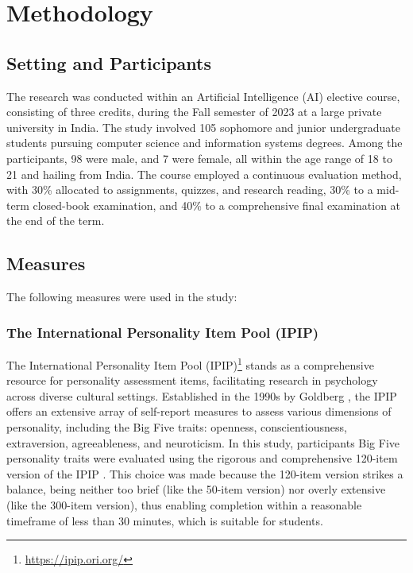\section{Methodology} \label{sec:method}

\subsection{Setting and Participants}
The research was conducted within an Artificial Intelligence (AI) elective course, consisting of three credits, during the Fall semester of 2023 at a large private university in India. The study involved 105 sophomore and junior undergraduate students pursuing computer science and information systems degrees. Among the participants, 98 were male, and 7 were female, all within the age range of 18 to 21 and hailing from India. The course employed a continuous evaluation method, with 30\% allocated to assignments, quizzes, and research reading, 30\% to a mid-term closed-book examination, and 40\% to a comprehensive final examination at the end of the term.

\subsection{Measures}
The following measures were used in the study:
\subsubsection{The International Personality Item Pool (IPIP)}
The International Personality Item Pool (IPIP)\footnote{\url{https://ipip.ori.org/}} stands as a comprehensive resource for personality assessment items, facilitating research in psychology across diverse cultural settings. Established in the 1990s by Goldberg \cite{Goldberg}, the IPIP offers an extensive array of self-report measures to assess various dimensions of personality, including the Big Five traits: openness, conscientiousness, extraversion, agreeableness, and neuroticism. In this study, participants Big Five personality traits were evaluated using the rigorous and comprehensive 120-item version of the IPIP \cite{JOHNSON201478}. This choice was made because the 120-item version strikes a balance, being neither too brief (like the 50-item version) nor overly extensive (like the 300-item version), thus enabling completion within a reasonable timeframe of less than 30 minutes, which is suitable for students.

